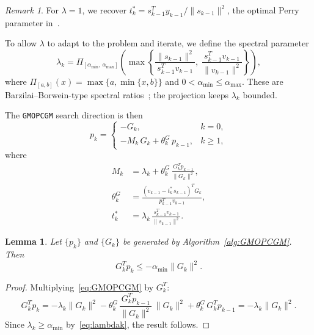 \documentclass{article}
\theoremstyle{plain}
\newtheorem{lemma}{Lemma}
\theoremstyle{definition}
\theoremstyle{remark}
\newtheorem{remark}{Remark}
\newcommand{\norm}[1]{\|#1\|}
\newcommand{\PI}[1]{\Pi_{#1}}
\newcommand{\algoname}[1]{{\small\texttt{#1}}}
\newcommand{\GMOPCGM}{\algoname{GMOPCGM}}
\newcommand{\thetaG}{\theta_k^{\scriptscriptstyle G}}     %
\newcommand{\tstar}{t_k^*}                                 %
\begin{document}
\begin{remark}
For $\lambda = 1$, we recover $\tstar = s_{k-1}^T y_{k-1}/\norm{s_{k-1}}^2$, the optimal Perry parameter in~\cite{sabi2023modified}.
\end{remark}

To allow $\lambda$ to adapt to the problem and iterate, we define the spectral parameter
\begin{equation}\label{eq:lambdak}
  \lambda_k = \PI{[\alpha_{\min},\, \alpha_{\max}]}\!\left(\max\!\left\{
    \frac{\norm{s_{k-1}}^2}{s_{k-1}^T v_{k-1}},\;
    \frac{s_{k-1}^T v_{k-1}}{\norm{v_{k-1}}^2}
  \right\}\right),
\end{equation}
where $\PI{[a,b]}(x) = \max\{a, \min\{x, b\}\}$ and $0 < \alpha_{\min} \leq \alpha_{\max}$. These are Barzilai--Borwein-type spectral ratios~\cite{barzilai1988two}; the projection keeps $\lambda_k$ bounded.

The \GMOPCGM{} search direction is then
\begin{equation}\label{eq:GMOPCGM}
  p_k = \begin{cases}
    -G_k, & k = 0, \\[6pt]
    -M_k\, G_k + \thetaG\, p_{k-1}, & k \geq 1,
  \end{cases}
\end{equation}
where
\begin{align}
  M_k &= \lambda_k + \thetaG\,\frac{G_k^T p_{k-1}}{\norm{G_k}^2}, \label{eq:Mk}\\[4pt]
  \thetaG &= \frac{(v_{k-1} - \tstar\, s_{k-1})^T G_k}{p_{k-1}^T v_{k-1}}, \label{eq:thetaG}\\[4pt]
  \tstar &= \lambda_k\,\frac{s_{k-1}^T v_{k-1}}{\norm{s_{k-1}}^2}. \label{eq:tstarv}
\end{align}

\begin{lemma}\label{lem:descentGMOP}
Let $\{p_k\}$ and $\{G_k\}$ be generated by Algorithm~\ref{alg:GMOPCGM}. Then
\begin{equation}\label{eq:descentGMOP}
  G_k^T p_k \leq -\alpha_{\min}\norm{G_k}^2.
\end{equation}
\end{lemma}
\begin{proof}
Multiplying~\eqref{eq:GMOPCGM} by $G_k^T$:
\[
  G_k^T p_k
  = -\lambda_k\norm{G_k}^2
    - \thetaG\,\frac{G_k^T p_{k-1}}{\norm{G_k}^2}\,\norm{G_k}^2
    + \thetaG\, G_k^T p_{k-1}
  = -\lambda_k\norm{G_k}^2.
\]
Since $\lambda_k \geq \alpha_{\min}$ by~\eqref{eq:lambdak}, the result follows.
\end{proof}
\end{document}
